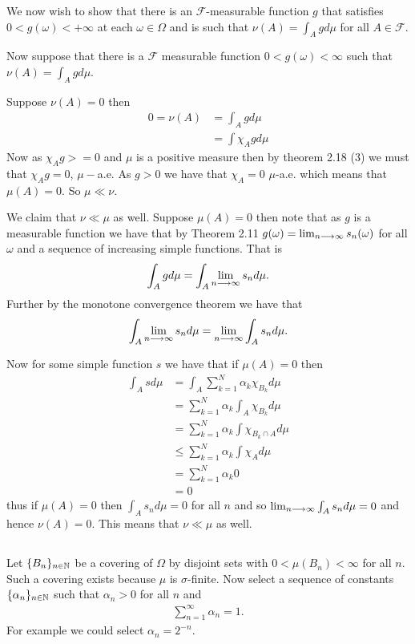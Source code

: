 \documentclass{unswmaths}
\begin{document}
We now wish to show that there is an $ \mathcal{F}$-measurable function $ g $ that satisfies $ 0 < g(\omega) < +\infty $ at each $ \omega \in \Omega $ and is such that $ \nu(A) = \int_Agd\mu $ for all $ A \in \mathcal{F} $.


Now suppose that there is a $ \mathcal{F} $ measurable function $ 0 < g(\omega) < \infty $ such that $ \nu(A) = \int_{A} g d\mu $.

Suppose $ \nu(A) =0 $ then
\begin{align}
	0 = \nu(A) &= \int_A g d\mu \\
	 &= \int \chi_A g d\mu
\end{align}
Now as $ \chi_A g >= 0 $ and $ \mu $ is a positive measure then by theorem 2.18 (3) we must that $ \chi_Ag = 0 $, $ \mu-$a.e. As $ g > 0 $ we have that $ \chi_A = 0 $ $ \mu$-a.e. which means that $ \mu(A) = 0 $.
So $ \mu \ll \nu $.

We claim that $ \nu \ll \mu $ as well. Suppose $ \mu(A) =0 $ then note that as $ g $ is a measurable function we have that by Theorem 2.11 $ g(\omega) = \lim_{n\longrightarrow\infty} s_n(\omega) $ for all $ \omega $ and a sequence of increasing simple functions.
That is
\begin{align}
	\int_A g d\mu = \int_A \lim_{n\longrightarrow\infty} s_n d\mu.
\end{align}
Further by the monotone convergence theorem we have that 
\begin{align}
\int_A \lim_{n\longrightarrow\infty} s_n d\mu = \lim_{n\longrightarrow\infty}\int_A s_n d\mu.
\end{align}

Now for some simple function $ s $ we have that if $ \mu(A) =0 $ then 
\begin{align}
	\int_A s d\mu &= \int_A\sum_{k=1}^{N} \alpha_k \chi_{B_k} d\mu \\
		&= \sum_{k=1}^N \alpha_k \int_A \chi_{B_k} d\mu \\
		&= \sum_{k=1}^N \alpha_k \int \chi_{B_k\cap A} d\mu \\
		&\leq  \sum_{k=1}^N \alpha_k \int \chi_{A} d\mu \\
		&= \sum_{k=1}^N \alpha_k 0\\
		&= 0
\end{align}
thus if $ \mu(A) = 0 $ then $ \int_A s_n d\mu =0 $ for all $ n $ and so $ \lim_{n \longrightarrow\infty} \int_A s_n d\mu = 0$ and hence $ \nu(A) =0 $. This means that $ \nu \ll \mu $ as well.

\subsection{}
Let $ \{ B_n \}_{n \in \mathbb{N}} $ be a covering of $ \Omega $ by disjoint sets with $ 0 < \mu(B_n) < \infty $ for all $ n $. Such a covering exists because $ \mu $ is $\sigma$-finite. Now select a sequence of constants $ \{ \alpha_n \}_{n \in \mathbb{N}} $ such that $ \alpha_n > 0 $ for all $ n $ and 
\begin{align}
	\sum_{n=1}^\infty \alpha_n = 1.
\end{align}
For example we could select  $ \alpha_n = 2^{-n} $.
\end{document}
